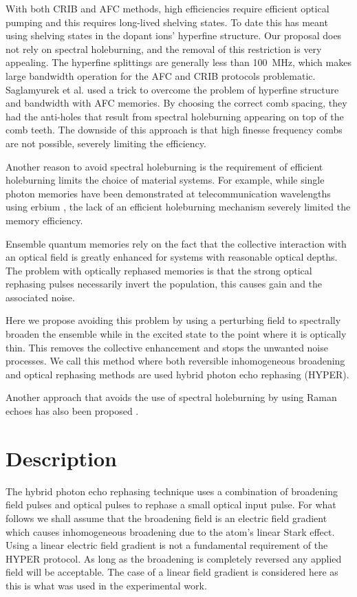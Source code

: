                                                                                                                                                                                                                                                                                                                                                                                                                                                                                                                                                                                                                                                                                                                                                                                                                                                                                                                                                                                                                                                                                                                                                                                                                                                                                                                                                                                                                                                                                                                                                                                                                                                                                                                                                                                                                                                                                                                                                                                                                                                                                                                                                                                                                                                                                                                                                                                                                                                                                                                                                                                                                                                                                                                                                                                                                                                                                                                                                                                                                                                                                                                                                                                                                                                                                                                                                                                                                                                                                                                                                                                                                                                                                                                                                                                                                                                                                                                                                                                                                                                                                                                                                                                                                                                                                                                                                                                                                                                                                                                                                                                                                                                                                                                                                                                                                                                                                                                                                                                                                                                                                                                                                                                                                                                                                                                                                                                                                                                                                                                                                                                                                                                                                                                                                                                                                                                                                                                                                                                                                                                                                                                                                                                                                                                                                                                                                                                                                                                                                                                                                                                                                                                                                                                                                                                                                                                                                                                                                                                                                                                                                                                                                                                                                                                                                                                                                                                                                                                                                                                                                                                                                                                                                                                                                                                                                                                                                                                                                                                                                                                                                                                                                                                                                                                                                                                                                                                                                                                                                                                                                                                                                                                                                                                                                                                                                                                                                                                                                                                                                                                                                                                                                                                                                                                                                                                                                                                                                                                                                                                                                                                                                                                                                                                                                                                                                                                                                                                                                                                                                                                                                                                                                                                                                                                                                                                                                                                                                                                                                                                                                                                                                                                                                                                                                                                                                                                                                                                                                                                                                                                                                                                                                                                                                                                                                                                                                                                                                                                                                                                                                                                                                                                                                                                                                                                                                                                                                                                                                                                                                                                                                                                                                                                                                                                                                                                                                                                                                                                                                                                                                                                                                                                                                                                                                                                                                                                                                                                                                                                                                                                                                                                                                                                                                                                                                                                                                                                                                                                                                                                                                                                                                                                                                                                                                                                                                                                                                                                                                                                                                                                                                                                                                                                                                                                                                                                                                                                                                                                                                                                                                                                                                                                                                                                                                                                                                                                                                                                                                                                                                                                                                                                                                                                                                                                                                                                                                                                                                                                                                                                                                                                                                                                                                                                                                                                                                                                                                                                                                                                                                                                                                                                                                                                                                                                                                                                                                                                                                                                                                                                                                                                                                                                                                                                                                                                                                                                                                                                                                                                                                                                                                                                                                                                                                                                                                                                                                                                                                                                                                                                                                                                                                                                                                                                                                                                                                                                                                                                                                                                                                                                                                                                                                                                                                                                                                                                                                                                                                                                                                                                                                                                                                                                                                                                                                                                                                                                                                                                                                                                                                                                                                                                                                                                                                                                                                                                                                                                                                                                                                                                                                                                                                                                                                                                                                                                                                                                                                                                                                                                                                                                                                                                                                                                                                                                                                                                                                                                                                                                                                                                                                                                                                                                                                                                                                                                                                                                                                                                                                                                                                                                                                                                                                                                                                                                                                                                                                                                                                                                                                                                                                                                                                                                                                                                                                                                                                                                                                                                                                                                                                                                                                                                                                                                                                                                                                                                                                                                                                                                                                                                                                                                                                                                                                                                                                                                                                                                                                                                                                                                                                                                                                                                                                                                                                                                                                                                                                                                                                                                                                                                                                                                                                                                                                                                                                                                                                                                                                                                                                                                                                                                                                                                                                                                                                                                                                                                                                                                                                                                                                                                                                                                                                                                                                                                                                                                                                                                                                                                                                                                                                                                                                                                                                                                                                                                                                                                                                                                                                                                                                                                                                                                                                                                                                                                                                                                                                                                                                                                                                                                                                                                                                                                                                                                                                                                                                                                                                                                                                                                                                                                                                                                                                                                                                                                                                                                                                                                                                                                                                                                                                                                                                                                                                                                                                                                                                                                                                                                                                                                                                                                                                                                                                                                                                                                                                                                                                                                                                                                                                                                                                                                                                                                                                                                                                                                                                                                                                                                                                                                                                                                                                                                                                                                                                                                                                                                                                                                                                                                                                                                                                                                                                                                                                                                                                                                                                                                                                                                                                                                                                                                                                                                                                                                                                                                                                                                                                                                                                                                                                                                                                                                                                                                                                                                                                                                                                                                                                                                                                                                                                                                                                                                                                                                                                                                                                                                                                                                                                                                                                                                                                                                                                                                                                                                                                                                                                                                                                                                                                                                                                                                                                                                                                                                                                                                                                                                                                                                                                                                                                                                                                                                                                                                                                                                                                                                                                                                                                                                                                                                                                                                                                                                                                                                                                                                                                                                                                                                                                                                                                                                                                                                                                                                                                                                                                                                                                                                                                                                                                                                                                                                                                                                                                                                                                                                                                                                                                                                                                                                                                                                                                                                                                                                                                                                                                                                                                                                                                                                                                                                                                                                                                                                                                                                                                                                                                                                                                                                                                                                                                                                                                                                                                                                                                                                                                                                                                                                                                                                                                                                                                                                                                                                                                                                                                                                                                                                                                                                                                                                                                                                                                                                                                                                                                                                                                                                                                                                                                                                                                                                                                                                                                                                                                                                                                                                                                                                                                                                                                                                                                                                                                                                                                                                                                                                                                                                                                                                                                                                                                                                                                                                                                                                                                                                                                                                                                                                                                                                                                                                                                                                                                                                                                                                                                                                                                                                                                                                                                                                                                                                                                                                                                                                                                                                                                                                                                                                                                                                                                                                                                                                                                                                                                                                                                                                                                                                                                                                                                                                                                                                                                                                                                                                                                                                                                                                                                                                                                                                                                                                                                                                                                                                                                                                                                                                                                                                                                                                                                                                                                                                                                                                                                                                                                                                                                                                                                                                                                                                                                                                                                                                                                                                                                                                                                                                                                                                                                                                                                                                                                                                                                                                                                                                                                                                                                                                                                                                                                                                                                                                                                                                                                                                                                                                                                                                                                                                                                                                                                                                                                                                                                                                                                                                                                                                                                                                                                                                                                                                                                                                                                                                                                                                                                                                                                                                                                                                                                                                                                                                                                                                                                                                                                                                                                                                                                                                                                                                                                                                                                                                                                                                                                                                                                                                                                                                                                                                                                                                                                                                                                                                                                                                                                                                                                                                                                                                                                                                                                                                                                                                                                                                                                                                                                                                                                                                                                                                                                                                                                                                                                                                                                                                                                                                                                                                                                                                                                                                                                                                                                                                                                                                                                                                                                                                                                                                                                                                                                                                                                                                                                                                                                                                                                                                                                                                                                                                                                                                                                                                                                                                                                                                                                                                                                                                                                                                                                                                                                                                                                                                                                                                                                                                                                                                                                                                                                                                                                                                                                                                                                                                                                                                                                                                                                                                                                                                                                                                                                                                                                                                                                                                                                                                                                                                                                                                                                                                                                                                                                                                                                                                                                                                                                                                                                                                                                                                                                                                                                                                                                                                                                                                                                                                                                                                                                                                                                                                                                                                                                                                                                                                                                                                                                                                                                                                                                                                                                                                                                                                                                                                                                                                                                                                                                                                                                                                                                                                                                                                                                                                                                                                                                                                                                                                                                                                                                                                                                                                                                                                                                                                                                                                                                                                                                                                                                                                                                                                                                                                                                                                                                                                                                                                    \documentclass[superscriptaddress,pra,twocolumn,showpacs,amsmath,amssymb,aps,a4paper]{revtex4}
\begin{document}
With both CRIB and AFC methods, high efficiencies require efficient
optical pumping and this requires long-lived shelving states. To date
this has meant using shelving states in the dopant ions' hyperfine
structure.  Our proposal does not rely on spectral holeburning, and
the removal of this restriction is very appealing. The
hyperfine splittings are generally less than 100~MHz, which makes
large bandwidth operation for the AFC and CRIB protocols
problematic. Saglamyurek et al. \cite{sagl10} used a trick to overcome
the problem of hyperfine structure and bandwidth with AFC memories. By
choosing the correct comb spacing, they had the anti-holes that result 
from spectral holeburning appearing on top of the comb teeth. The downside
of this approach is that high finesse frequency combs are not possible,
severely limiting the efficiency.  

Another reason to avoid
spectral holeburning is the requirement of efficient holeburning
limits the choice of material systems. For example, while single
photon memories have been demonstrated at telecommunication
wavelengths using erbium \cite{laur10}, the lack of an efficient
holeburning mechanism severely limited the memory efficiency.


Ensemble quantum memories rely on the fact that the collective
interaction with an optical field is greatly enhanced for systems
with reasonable optical depths. The problem with optically rephased
memories is that the strong optical rephasing pulses necessarily invert
the population, this causes gain and the associated noise. 

Here we propose avoiding this problem by using a perturbing field to
spectrally broaden the ensemble while in the excited state to the
point where it is optically thin. This removes the collective
enhancement and stops the unwanted noise processes. We call this
method where both reversible inhomogeneous broadening and optical
rephasing methods are used hybrid photon echo rephasing (HYPER).

Another approach that avoids the use of spectral holeburning by using
Raman echoes has also been proposed \cite{mois11}. 


\section{Description}

The hybrid photon echo rephasing technique uses a combination of
broadening field pulses and optical pulses to rephase a small optical
input pulse. For what follows we shall assume that the broadening
field is an electric field gradient which causes inhomogeneous
broadening due to the atom's linear Stark effect. Using a linear
electric field gradient is not a fundamental requirement of the HYPER
protocol. As long as the broadening is completely reversed any applied
field will be acceptable. The case of a linear field gradient is
considered here as this is what was used in the experimental work.
\end{document}
